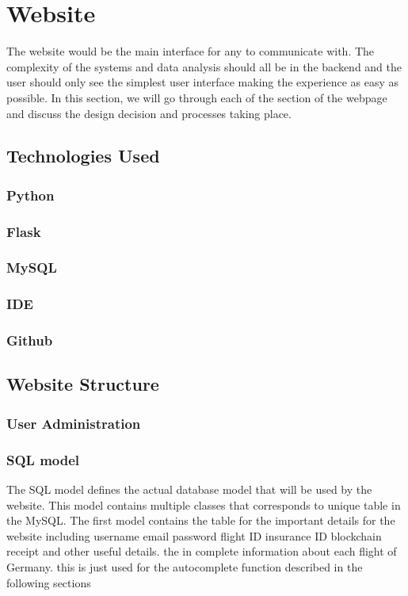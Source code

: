 \chapter{Website}

The website would be the main interface for any to communicate with. The complexity of the systems and data analysis should all be in the backend and the user should only see the simplest user interface making the experience as easy as possible. In this section, we will go through each of the section of the webpage and discuss the design decision and processes taking place.

\section{Technologies Used}
\subsection{Python}
\subsection{Flask}
\subsection{MySQL}
\subsection{IDE}
\subsection{Github}

\section{Website Structure}
\subsection{User Administration}
\subsection{SQL model}
The SQL model defines the actual database model that will be used by the website. This model contains multiple classes that corresponds to unique table in the MySQL. The first model contains the table for the important details for the website including username email password flight ID insurance ID blockchain receipt and other useful details. the in complete information about each flight of Germany. this is just used for the autocomplete function described in the following sections
